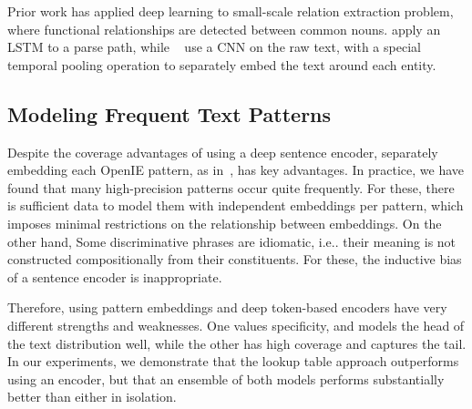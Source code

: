 Prior work has applied deep learning to small-scale relation extraction problem, where functional relationships are detected between common nouns. \citet{xu2015classifying} apply an LSTM to a parse path, while ~\citet{zengdistant} use a CNN on the raw text, with a special temporal pooling operation to separately embed the text around each entity.

\subsection{Modeling Frequent Text Patterns}
\label{sec:non-comp}

Despite the coverage advantages of using a deep sentence encoder, separately embedding each OpenIE pattern, as in~\citet{limin}, has key advantages. In practice, we have found that many high-precision patterns occur quite frequently. For these, there is sufficient data to model them with independent embeddings per pattern, which imposes minimal restrictions on the relationship between embeddings. On the other hand, Some discriminative phrases are idiomatic, i.e.. their meaning is not constructed compositionally from their constituents. For these, the inductive bias of a sentence encoder is inappropriate. 

Therefore, using pattern embeddings and deep token-based encoders have very different strengths and weaknesses. One values specificity, and models the head of the text distribution well, while the other has high coverage and captures the tail.  In our experiments, we demonstrate that the lookup table approach outperforms using an encoder, but that an ensemble of both models performs substantially better than either in isolation.



